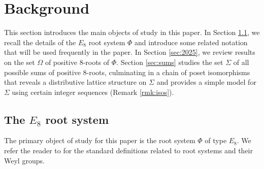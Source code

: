 \documentclass[11pt]{amsart}
\theoremstyle{plain}
\theoremstyle{definition}
\theoremstyle{remark}
\numberwithin{equation}{section}
\newcommand{\allroots}{\Phi}
\newcommand{\ob}{\Omega}
\begin{document}
%
\section{Background}\label{sec:state}
This section introduces the main objects of study in this paper. In Section
\ref{sec:Phi}, we recall the details of the $E_8$ root system $\Phi$ and
introduce some related notation that will be used frequently in the paper. In
Section \ref{sec:2025}, we review results on the set $\ob$ of positive 8-roots
of $\Phi$. Section \ref{sec:sums} studies the set $\Sigma$ of all possible sums
of positive 8-roots, culminating in a chain of poset isomorphisms that reveals a
distributive lattice structure on $\Sigma$ and provides a simple model for
$\Sigma$ using certain integer sequences (Remark \ref{rmk:isos}).

\subsection{The $E_8$ root system}
\label{sec:Phi}
The primary object of study for this paper is the root system $\allroots$ of
type $E_8$. We refer the reader to \cite[Chapters 1 and 2]{humphreys90} for the
standard definitions related to root systems and their Weyl groups.
\end{document}

